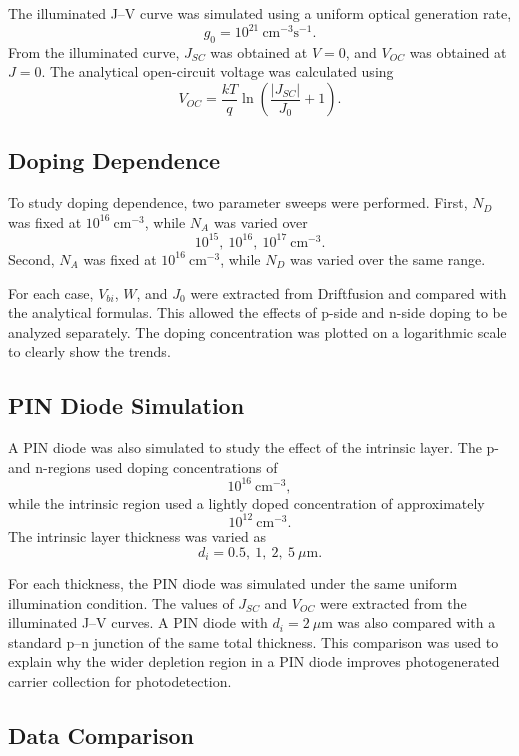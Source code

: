 \documentclass[11pt,a4paper]{article}
\begin{document}
The illuminated J--V curve was simulated using a uniform optical generation rate,
\[
g_0 = 10^{21}\ \mathrm{cm^{-3}s^{-1}}.
\]
From the illuminated curve, $J_{SC}$ was obtained at $V=0$, and $V_{OC}$ was obtained at $J=0$. The analytical open-circuit voltage was calculated using
\begin{equation}
V_{OC}
=
\frac{kT}{q}
\ln
\left(
\frac{|J_{SC}|}{J_0}+1
\right).
\end{equation}

\subsection{Doping Dependence}

To study doping dependence, two parameter sweeps were performed. First, $N_D$ was fixed at $10^{16}\ \mathrm{cm^{-3}}$, while $N_A$ was varied over
\[
10^{15},\ 10^{16},\ 10^{17}\ \mathrm{cm^{-3}}.
\]
Second, $N_A$ was fixed at $10^{16}\ \mathrm{cm^{-3}}$, while $N_D$ was varied over the same range.

For each case, $V_{bi}$, $W$, and $J_0$ were extracted from Driftfusion and compared with the analytical formulas. This allowed the effects of p-side and n-side doping to be analyzed separately. The doping concentration was plotted on a logarithmic scale to clearly show the trends.

\subsection{PIN Diode Simulation}

A PIN diode was also simulated to study the effect of the intrinsic layer. The p- and n-regions used doping concentrations of
\[
10^{16}\ \mathrm{cm^{-3}},
\]
while the intrinsic region used a lightly doped concentration of approximately
\[
10^{12}\ \mathrm{cm^{-3}}.
\]
The intrinsic layer thickness was varied as
\[
d_i = 0.5,\ 1,\ 2,\ 5\ \mu\mathrm{m}.
\]

For each thickness, the PIN diode was simulated under the same uniform illumination condition. The values of $J_{SC}$ and $V_{OC}$ were extracted from the illuminated J--V curves. A PIN diode with $d_i = 2\ \mu\mathrm{m}$ was also compared with a standard p--n junction of the same total thickness. This comparison was used to explain why the wider depletion region in a PIN diode improves photogenerated carrier collection for photodetection.

\subsection{Data Comparison}
\end{document}
